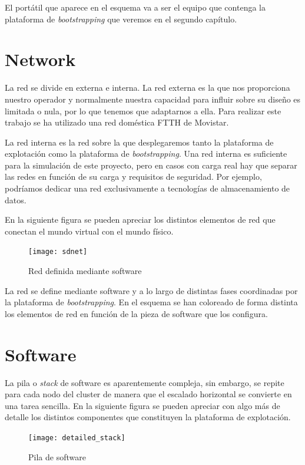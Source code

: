 \documentclass[a4paper,12pt,spanish,final]{epsc_tfc_pfc}
\begin{document}
El portátil que aparece en el esquema va a ser el equipo que contenga la plataforma de \emph{bootstrapping} que veremos en el segundo capítulo.

\clearpage

\section{Network}

La red se divide en externa e interna. La red externa es la que nos proporciona nuestro operador y normalmente nuestra capacidad para influir sobre su diseño es limitada o nula, por lo que tenemos que adaptarnos a ella. Para realizar este trabajo se ha utilizado una red doméstica FTTH de Movistar.

La red interna es la red sobre la que desplegaremos tanto la plataforma de explotación como la plataforma de \emph{bootstrapping}. Una red interna es suficiente para la simulación de este proyecto, pero en casos con carga real hay que separar las redes en función de su carga y requisitos de seguridad. Por ejemplo, podríamos dedicar una red exclusivamente a tecnologías de almacenamiento de datos.

En la siguiente figura se pueden apreciar los distintos elementos de red que conectan el mundo virtual con el mundo físico.

\begin{figure}[h]
  \centering
    \texttt{[image: sdnet]}
      \caption{Red definida mediante software}
\end{figure}

La red se define mediante software y a lo largo de distintas fases coordinadas por la plataforma de \emph{bootstrapping}. En el esquema se han coloreado de forma distinta los elementos de red en función de la pieza de software que los configura.

\section{Software}

La pila o \emph{stack} de software es aparentemente compleja, sin embargo, se repite para cada nodo del cluster de manera que el escalado horizontal se convierte en una tarea sencilla. En la siguiente figura se pueden apreciar con algo más de detalle los distintos componentes que constituyen la plataforma de explotación.

\begin{figure}[h]
  \centering
    \texttt{[image: detailed\_stack]}
      \caption{Pila de software}
\end{figure}
\end{document}
